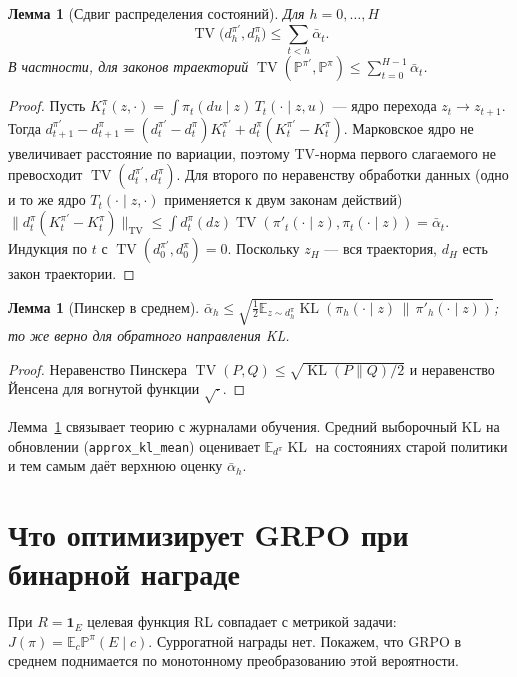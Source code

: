 \documentclass[11pt,a4paper]{article}
\theoremstyle{plain}
\newtheorem{lemma}[theorem]{Лемма}
\theoremstyle{definition}
\theoremstyle{remark}
\newcommand{\E}{\mathbb{E}}
\newcommand{\PP}{\mathbb{P}}
\DeclareMathOperator{\TV}{TV}
\DeclareMathOperator{\KL}{KL}
\newcommand{\ab}{\bar\alpha}
\newcommand{\one}{\mathbf 1}
\begin{document}
\begin{lemma}[Сдвиг распределения состояний]\label{lem:shift}
Для $h=0,\dots,H$
\[
\TV\bigl(d^{\pi'}_h,d^\pi_h\bigr)\le\sum_{t<h}\ab_t .
\]
В частности, для законов траекторий $\TV(\PP^{\pi'},\PP^\pi)\le\sum_{t=0}^{H-1}\ab_t$.
\end{lemma}
\begin{proof}
Пусть $K^\pi_t(z,\cdot)=\int\pi_t(du\mid z)\,T_t(\cdot\mid z,u)$ --- ядро перехода $z_t\to z_{t+1}$. Тогда
$d^{\pi'}_{t+1}-d^\pi_{t+1}=(d^{\pi'}_t-d^\pi_t)K^{\pi'}_t+d^\pi_t(K^{\pi'}_t-K^\pi_t)$.
Марковское ядро не увеличивает расстояние по вариации, поэтому TV-норма первого слагаемого не превосходит $\TV(d^{\pi'}_t,d^\pi_t)$. Для второго по неравенству обработки данных (одно и то же ядро $T_t(\cdot\mid z,\cdot)$ применяется к двум законам действий)
$\|d^\pi_t(K^{\pi'}_t-K^\pi_t)\|_{\TV}\le\int d^\pi_t(dz)\TV(\pi'_t(\cdot\mid z),\pi_t(\cdot\mid z))=\ab_t$.
Индукция по $t$ с $\TV(d^{\pi'}_0,d^\pi_0)=0$. Поскольку $z_H$ --- вся траектория, $d_H$ есть закон траектории.
\end{proof}

\begin{lemma}[Пинскер в среднем]\label{lem:pinsker}
$\ab_h\le\sqrt{\tfrac12\E_{z\sim d^\pi_h}\KL(\pi_h(\cdot\mid z)\,\|\,\pi'_h(\cdot\mid z))}$; то же верно для обратного направления KL.
\end{lemma}
\begin{proof}
Неравенство Пинскера $\TV(P,Q)\le\sqrt{\KL(P\|Q)/2}$ и неравенство Йенсена для вогнутой функции $\sqrt{\cdot}$.
\end{proof}

Лемма~\ref{lem:pinsker} связывает теорию с журналами обучения. Средний выборочный KL на обновлении (\texttt{approx\_kl\_mean}) оценивает $\E_{d^\pi}\KL$ на состояниях старой политики и тем самым даёт верхнюю оценку $\ab_h$.

\section{Что оптимизирует GRPO при бинарной награде}\label{sec:objective}

При $R=\one_E$ целевая функция RL совпадает с метрикой задачи: $J(\pi)=\E_c\PP^\pi(E\mid c)$. Суррогатной награды нет. Покажем, что GRPO в среднем поднимается по монотонному преобразованию этой вероятности.
\end{document}

